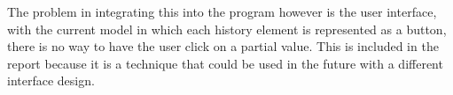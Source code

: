 The problem in integrating this into the program however is the user interface,
with the current model in which each history element is represented as a button,
there is no way to have the user click on a partial value. This is included in
the report because it is a technique that could be used in the future with a
different interface design.
